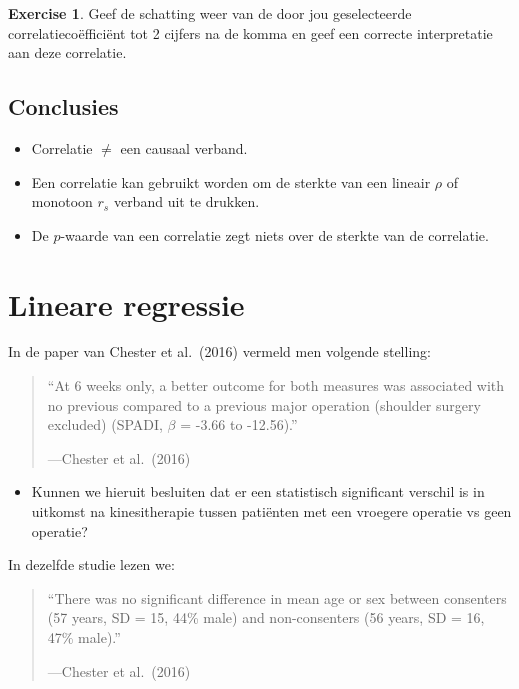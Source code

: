 \documentclass[
]{book}
\providecommand{\tightlist}{%
  \setlength{\itemsep}{0pt}\setlength{\parskip}{0pt}}
\theoremstyle{definition}
\theoremstyle{definition}
\theoremstyle{definition}
\newtheorem{exercise}{Exercise}[chapter]
\theoremstyle{definition}
\theoremstyle{remark}
\begin{document}
\begin{exercise}
Geef de schatting weer van de door jou geselecteerde correlatiecoëfficiënt tot 2 cijfers na de komma en geef een correcte interpretatie aan deze correlatie.
\end{exercise}

\hypertarget{conclusies}{%
\section*{Conclusies}\label{conclusies}}


\begin{itemize}
\tightlist
\item
  Correlatie \(\neq\) een causaal verband.
\item
  Een correlatie kan gebruikt worden om de sterkte van een lineair \(\rho\) of monotoon \(r_s\) verband uit te drukken.
\item
  De \(p\)-waarde van een correlatie zegt niets over de sterkte van de correlatie.
\end{itemize}

\mainmatter

\hypertarget{regr}{%
\chapter{Lineare regressie}\label{regr}}

In de paper van Chester et al.~(2016) vermeld men volgende stelling:

\begin{quote}
``At 6 weeks only, a better outcome for both measures was associated with no previous compared to a previous major operation (shoulder surgery excluded) (SPADI, \(\beta\) = -3.66 to -12.56).''

---Chester et al.~(2016)
\end{quote}

\begin{itemize}
\tightlist
\item
  Kunnen we hieruit besluiten dat er een statistisch significant verschil is in uitkomst na kinesitherapie tussen patiënten met een vroegere operatie vs geen operatie?
\end{itemize}

In dezelfde studie lezen we:

\begin{quote}
``There was no significant difference in mean age or sex between consenters (57 years, SD = 15, 44\% male) and non-consenters (56 years, SD = 16, 47\% male).''

---Chester et al.~(2016)
\end{quote}
\end{document}
